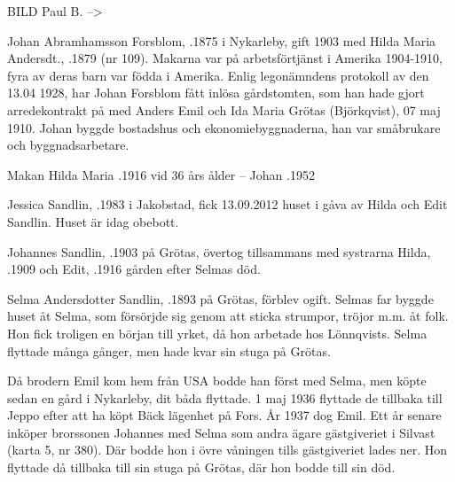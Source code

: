 BILD Paul B. -->

Johan Abramhamsson Forsblom, .1875 i Nykarleby, gift 1903 med Hilda Maria Andersdt., .1879 (nr 109).  Makarna var på arbetsförtjänst i Amerika 1904-1910, fyra av deras barn var födda i Amerika. Enlig legonämndens protokoll av den 13.04 1928, har Johan Forsblom fått inlösa gårdstomten, som han hade gjort arredekontrakt  på  med Anders Emil och Ida Maria Grötas (Björkqvist), 07 maj 1910. Johan byggde bostadshus och ekonomiebyggnaderna, han var småbrukare och byggnadsarbetare.
\begin{jhchildren}
  \item {}
  \item {}
  \item {}
  \item {}
  \item {}
\end{jhchildren}

Makan Hilda Maria .1916 vid 36 års ålder  --  Johan .1952




Jessica Sandlin, .1983  i Jakobstad, fick 13.09.2012 huset i gåva av Hilda och Edit Sandlin. Huset är idag obebott.


Johannes Sandlin, .1903 på Grötas, övertog tillsammans med systrarna Hilda, .1909 och Edit, .1916 gården efter Selmas död.


Selma  Andersdotter Sandlin, .1893 på Grötas, förblev ogift. Selmas far byggde huset åt Selma, som försörjde sig genom att sticka strumpor, tröjor m.m. åt folk. Hon fick troligen en början till yrket, då hon arbetade hos Lönnqvists. Selma flyttade många gånger, men hade kvar sin stuga på Grötas.


Då brodern Emil kom hem från USA bodde han först med Selma, men köpte sedan en gård i Nykarleby, dit båda flyttade. 1 maj 1936 flyttade de tillbaka till Jeppo efter att ha köpt Bäck lägenhet på Fors. År 1937 dog Emil. Ett år senare inköper brorssonen Johannes med Selma som andra ägare gästgiveriet i Silvast (karta 5, nr 380). Där bodde hon i övre våningen tills gästgiveriet lades ner. Hon flyttade då tillbaka till sin stuga på Grötas, där hon bodde till sin död.

